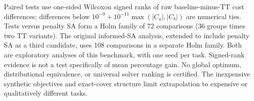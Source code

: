 Paired tests use one-sided Wilcoxon signed ranks of raw baseline-minus-TT
cost differences; differences below $10^{-9}+10^{-11}\max(|C_a|,|C_b|)$
are numerical ties. Tests versus penalty SA form a Holm family of 72 comparisons
(36 groups times two TT variants). The original informed-SA analysis, extended
to include penalty SA as a third candidate, uses 108 comparisons in a separate
Holm family. Both are exploratory analyses of this benchmark, with one seed
per task. Signed-rank evidence is not a test specifically of mean percentage
gain. No global optimum, distributional equivalence, or universal solver
ranking is certified. The inexpensive synthetic objectives and exact-cover
structure limit extrapolation to expensive or qualitatively different tasks.




